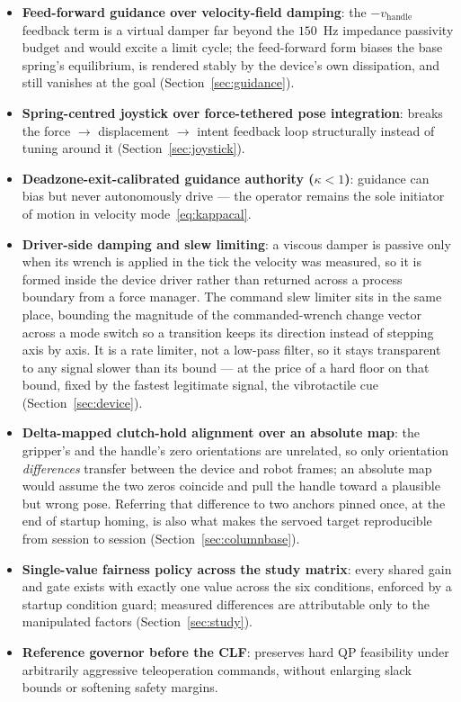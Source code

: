 \documentclass[12pt,a4paper,twoside,openright]{report}
\begin{document}
\begin{itemize}[nosep]
\item \textbf{Feed-forward guidance over velocity-field damping}: the $-v_{\text{handle}}$ feedback term is a virtual damper far beyond the $150$~Hz impedance passivity budget and would excite a limit cycle; the feed-forward form biases the base spring's equilibrium, is rendered stably by the device's own dissipation, and still vanishes at the goal (Section~\ref{sec:guidance}).
\item \textbf{Spring-centred joystick over force-tethered pose integration}: breaks the force $\to$ displacement $\to$ intent feedback loop structurally instead of tuning around it (Section~\ref{sec:joystick}).
\item \textbf{Deadzone-exit-calibrated guidance authority ($\kappa < 1$)}: guidance can bias but never autonomously drive --- the operator remains the sole initiator of motion in velocity mode~\eqref{eq:kappacal}.
\item \textbf{Driver-side damping and slew limiting}: a viscous damper is passive only when its wrench is applied in the tick the velocity was measured, so it is formed inside the device driver rather than returned across a process boundary from a force manager. The command slew limiter sits in the same place, bounding the magnitude of the commanded-wrench change vector across a mode switch so a transition keeps its direction instead of stepping axis by axis. It is a rate limiter, not a low-pass filter, so it stays transparent to any signal slower than its bound --- at the price of a hard floor on that bound, fixed by the fastest legitimate signal, the vibrotactile cue (Section~\ref{sec:device}).
\item \textbf{Delta-mapped clutch-hold alignment over an absolute map}: the gripper's and the handle's zero orientations are unrelated, so only orientation \emph{differences} transfer between the device and robot frames; an absolute map would assume the two zeros coincide and pull the handle toward a plausible but wrong pose. Referring that difference to two anchors pinned once, at the end of startup homing, is also what makes the servoed target reproducible from session to session (Section~\ref{sec:columnbase}).
\item \textbf{Single-value fairness policy across the study matrix}: every shared gain and gate exists with exactly one value across the six conditions, enforced by a startup condition guard; measured differences are attributable only to the manipulated factors (Section~\ref{sec:study}).
\item \textbf{Reference governor before the CLF}: preserves hard QP feasibility under arbitrarily aggressive teleoperation commands, without enlarging slack bounds or softening safety margins.

\end{itemize}
\end{document}
